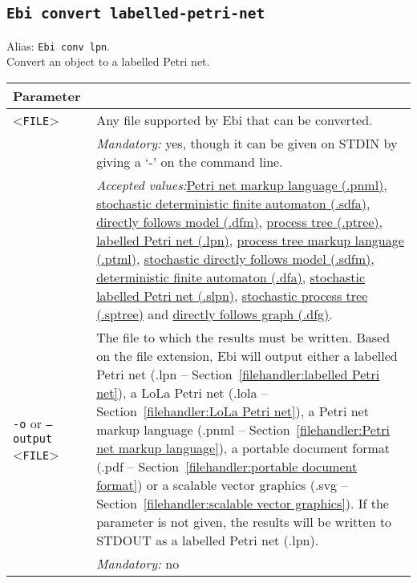 {\subsection{\texttt{Ebi convert labelled-petri-net}}
\label{command:Ebi convert labelled-petri-net}
Alias: \texttt{Ebi conv lpn}.\\
Convert an object to a labelled Petri net.\\
\begin{tabularx}{\linewidth}{lX}
\toprule
Parameter \\\midrule
<\texttt{FILE}>&Any file supported by Ebi that can be converted.\\
&\textit{Mandatory:} \quad yes, though it can be given on STDIN by giving a `-' on the command line.\\
&\textit{Accepted values:}\quad \hyperref[filehandler:Petri net markup language]{Petri net markup language (.pnml)}, \hyperref[filehandler:stochastic deterministic finite automaton]{stochastic deterministic finite automaton (.sdfa)}, \hyperref[filehandler:directly follows model]{directly follows model (.dfm)}, \hyperref[filehandler:process tree]{process tree (.ptree)}, \hyperref[filehandler:labelled Petri net]{labelled Petri net (.lpn)}, \hyperref[filehandler:process tree markup language]{process tree markup language (.ptml)}, \hyperref[filehandler:stochastic directly follows model]{stochastic directly follows model (.sdfm)}, \hyperref[filehandler:deterministic finite automaton]{deterministic finite automaton (.dfa)}, \hyperref[filehandler:stochastic labelled Petri net]{stochastic labelled Petri net (.slpn)}, \hyperref[filehandler:stochastic process tree]{stochastic process tree (.sptree)} and \hyperref[filehandler:directly follows graph]{directly follows graph (.dfg)}.\\
\texttt{-o} or \texttt{--output} <\texttt{FILE}> &
The file to which the results must be written. Based on the file extension, Ebi will output either a labelled Petri net (.lpn -- Section~\ref{filehandler:labelled Petri net}), a LoLa Petri net (.lola -- Section~\ref{filehandler:LoLa Petri net}), a Petri net markup language (.pnml -- Section~\ref{filehandler:Petri net markup language}), a portable document format (.pdf -- Section~\ref{filehandler:portable document format}) or a scalable vector graphics (.svg -- Section~\ref{filehandler:scalable vector graphics}).
If the parameter is not given, the results will be written to STDOUT as a labelled Petri net (.lpn).\\
&\textit{Mandatory:} \quad no\\

\end{tabularx}}

